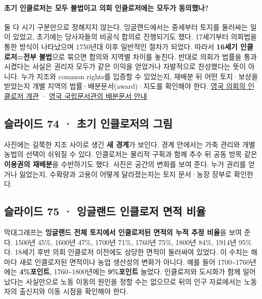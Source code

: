 \documentclass[10pt,a4paper]{article}
\begin{document}
\paragraph{초기 인클로저는 모두 불법이고 의회 인클로저에는 모두가 동의했나?}
둘 다 시기 구분만으로 정해지지 않는다. 잉글랜드에서는 중세부터 토지를 둘러싸는 일이 있었고, 초기에는 당사자들의 비공식 합의로 진행되기도 했다. 17세기부터 의회법을 통한 방식이 나타났으며 1750년대 이후 일반적인 절차가 되었다. 따라서 \textbf{16세기 인클로저=전부 불법}으로 묶으면 합의와 지역별 차이를 놓친다. 반대로 의회가 법률을 통과시켰다는 사실은 권리자 모두가 같은 이익을 얻었거나 자발적으로 찬성했다는 뜻이 아니다. 누가 지조와 common rights를 입증할 수 있었는지, 재배분 뒤 어떤 토지·보상을 받았는지 개별 지역의 법률·배분문서(award)·지도를 확인해야 한다. \href{https://www.parliament.uk/about/living-heritage/transformingsociety/towncountry/landscape/overview/enclosingland/}{영국 의회의 인클로저 개관} · \href{https://www.nationalarchives.gov.uk/help-with-your-research/research-guides/enclosure-awards}{영국 국립문서관의 배분문서 안내}\par

\subsection{슬라이드 74 · 초기 인클로저의 그림}
사진에는 길쭉한 지조 사이로 생긴 \textbf{새 경계}가 보인다. 경계 안에서는 가축 관리와 개별 농법의 선택이 쉬워질 수 있다. 인클로저는 물리적 구획과 함께 추수 뒤 공동 방목 같은 \textbf{이용권의 재배분}을 수반하기도 했다. 사진은 공간의 변화를 보여 준다. 누가 권리를 얻거나 잃었는지, 수확량과 고용이 어떻게 달라졌는지는 토지 문서·농장 장부로 확인한다.\par

\subsection{슬라이드 75 · 잉글랜드 인클로저 면적 비율}
막대그래프는 \textbf{잉글랜드 전체 토지에서 인클로저된 면적의 누적 추정 비율}을 보여 준다. 1500년 45\%, 1600년 47\%, 1700년 71\%, 1760년 75\%, 1800년 84\%, 1914년 95\%다. 18세기 후반 의회 인클로저 이전에도 상당한 면적이 둘러싸여 있었다. 이 수치는 해마다 새로 인클로저된 면적이나 농업 생산성의 변화가 아니다. 예를 들어 1700\textasciitilde{}1760년에는 \textbf{4\%포인트}, 1760\textasciitilde{}1800년에는 \textbf{9\%포인트} 늘었다. 인클로저와 도시화가 함께 일어났다는 사실만으로 노동 이동의 원인을 정할 수는 없으므로 뒤의 인구 자료에서는 노동자의 출신지와 이동 시점을 확인해야 한다.\par
\end{document}
